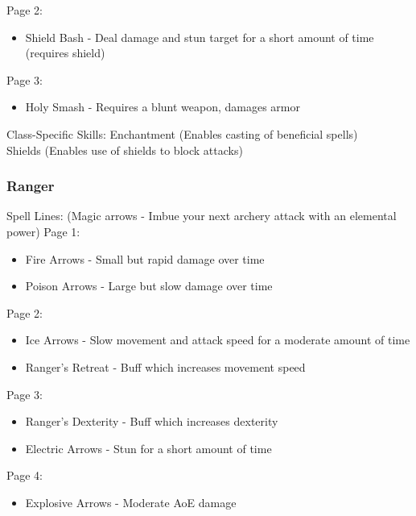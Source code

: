 \documentclass{article}
\begin{document}
Page 2:
\begin{itemize}
    \item Shield Bash -  Deal damage and stun target for a short amount of time (requires shield)
    
\end{itemize}

Page 3:
\begin{itemize}
    \item Holy Smash - Requires a blunt weapon, damages armor
\end{itemize}

Class-Specific Skills:
Enchantment (Enables casting of beneficial spells)\\
Shields (Enables use of shields to block attacks)\\


\subsubsection{Ranger}
Spell Lines:
(Magic arrows - Imbue your next archery attack with an elemental power)
Page 1:
\begin{itemize}
    \item Fire Arrows - Small but rapid damage over time
    \item Poison Arrows - Large but slow damage over time
    
\end{itemize}

Page 2:
\begin{itemize}
    \item Ice Arrows - Slow movement and attack speed for a moderate amount of time
    \item Ranger's Retreat - Buff which increases movement speed
    
\end{itemize}

Page 3:
\begin{itemize}
    \item Ranger's Dexterity - Buff which increases dexterity
    \item Electric Arrows - Stun for a short amount of time
    
\end{itemize}

Page 4:
\begin{itemize}
    \item Explosive Arrows - Moderate AoE damage
\end{itemize}
\end{document}
